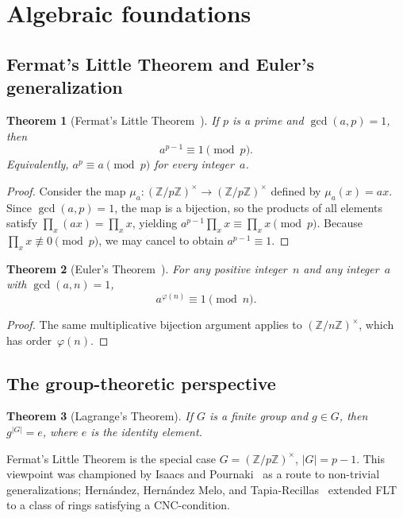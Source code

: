 \documentclass[12pt]{amsart}
\theoremstyle{plain}
\newtheorem{theorem}{Theorem}[section]
\theoremstyle{definition}
\theoremstyle{remark}
\newcommand{\Z}{\mathbb{Z}}
\begin{document}
\section{Algebraic foundations}\label{sec:algebra}

\subsection{Fermat's Little Theorem and Euler's generalization}

\begin{theorem}[Fermat's Little Theorem~\cite{euler1736}]
\label{thm:flt}
If $p$ is a prime and $\gcd(a,p)=1$, then
\[
  a^{p-1} \equiv 1 \pmod{p}.
\]
Equivalently, $a^{p}\equiv a\pmod{p}$ for every integer~$a$.
\end{theorem}

\begin{proof}
Consider the map $\mu_a\colon(\Z/p\Z)^{\times}\to(\Z/p\Z)^{\times}$
defined by $\mu_a(x)=ax$.  Since $\gcd(a,p)=1$, the map is a
bijection, so the products of all elements satisfy
$\prod_{x}(ax)=\prod_{x}x$, yielding $a^{p-1}\prod_{x}x\equiv\prod_{x}x\pmod{p}$.
Because $\prod_{x}x\not\equiv 0\pmod{p}$, we may cancel to obtain
$a^{p-1}\equiv 1$.
\end{proof}

\begin{theorem}[Euler's Theorem~\cite{euler1763}]
\label{thm:euler}
For any positive integer~$n$ and any integer~$a$ with $\gcd(a,n)=1$,
\[
  a^{\varphi(n)} \equiv 1 \pmod{n}.
\]
\end{theorem}

\begin{proof}
The same multiplicative bijection argument applies to
$(\Z/n\Z)^{\times}$, which has order~$\varphi(n)$.
\end{proof}

\subsection{The group-theoretic perspective}

\begin{theorem}[Lagrange's Theorem]\label{thm:lagrange}
If $G$ is a finite group and $g\in G$, then $g^{|G|}=e$, where $e$
is the identity element.
\end{theorem}

Fermat's Little Theorem is the special case
$G=(\Z/p\Z)^{\times}$, $|G|=p-1$.  This viewpoint was
championed by Isaacs and Pournaki~\cite{isaacs_pournaki2005} as a
route to non-trivial generalizations; Hern\'andez, Hern\'andez Melo,
and Tapia-Recillas~\cite{hernandez2020} extended FLT to a class of
rings satisfying a CNC-condition.
\end{document}
